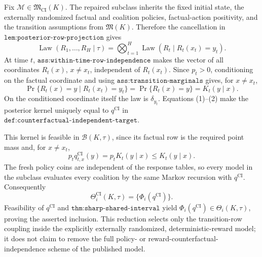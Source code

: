 Fix \(\mathcal M\in\mathfrak M_{\mathrm{CI}}(K)\).  The repaired subclass inherits the fixed initial state, the externally randomized factual and coalition policies, factual-action positivity, and the transition assumptions from \(\mathfrak M(K)\).  Therefore the cancellation in \(\texttt{lem:posterior-row-projection}\) gives
\[
 \operatorname{Law}(R_1,\ldots,R_H\mid\tau)
 =\bigotimes_{t=1}^H\operatorname{Law}(R_t\mid R_t(x_t)=y_t). \tag{1}
\]
At time \(t\), \(\texttt{ass:within-time-row-independence}\) makes the vector of all coordinates \(R_t(x)\), \(x\ne x_t\), independent of \(R_t(x_t)\).  Since \(p_t>0\), conditioning on the factual coordinate and using \(\texttt{ass:transition-marginals}\) gives, for \(x\ne x_t\),
\[
 \Pr\{R_t(x)=y\mid R_t(x_t)=y_t\}
 =\Pr\{R_t(x)=y\}=K_t(y\mid x). \tag{2}
\]
On the conditioned coordinate itself the law is \(\delta_{y_t}\).  Equations (1)--(2) make the posterior kernel uniquely equal to \(q^{\mathrm{CI}}\) in \(\texttt{def:counterfactual-independent-target}\).

This kernel is feasible in \(\mathcal B(K,\tau)\), since its factual row is the required point mass and, for \(x\ne x_t\),
\[
 p_tq_{t,x}^{\mathrm{CI}}(y)=p_tK_t(y\mid x)\le K_t(y\mid x).
\]
The fresh policy coins are independent of the response tables, so every model in the subclass evaluates every coalition by the same Markov recursion with \(q^{\mathrm{CI}}\).  Consequently
\[
 \Theta_i^{\mathrm{CI}}(K,\tau)=\{\Phi_i(q^{\mathrm{CI}})\}.
\]
Feasibility of \(q^{\mathrm{CI}}\) and \(\texttt{thm:sharp-shared-interval}\) yield \(\Phi_i(q^{\mathrm{CI}})\in\Theta_i(K,\tau)\), proving the asserted inclusion.  This reduction selects only the transition-row coupling inside the explicitly externally randomized, deterministic-reward model; it does not claim to remove the full policy- or reward-counterfactual-independence scheme of the published model.